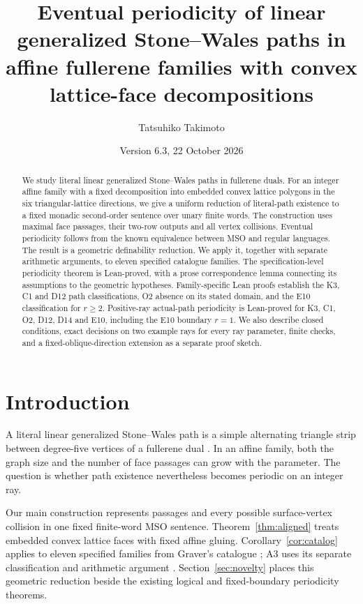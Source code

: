 \documentclass[11pt]{amsart}
\title[Affine fullerene families and eventual periodicity]{Eventual periodicity of linear generalized Stone--Wales paths in affine fullerene families with convex lattice-face decompositions}
\author{Tatsuhiko Takimoto}
\date{Version 6.3, 22 October 2026}
\theoremstyle{definition}\newtheorem{definition}{Definition}
\begin{document}
\begin{abstract}
We study literal linear generalized Stone--Wales paths in fullerene
duals. For an integer affine family with a fixed decomposition into
embedded convex lattice polygons in the six triangular-lattice
directions, we give a uniform reduction of literal-path existence to a
fixed monadic second-order sentence over unary finite words. The
construction uses maximal face passages, their two-row outputs and all
vertex collisions. Eventual periodicity follows from the known equivalence
between MSO and regular languages. The result is a geometric definability
reduction. We apply it, together with separate arithmetic arguments,
to eleven specified catalogue families. The specification-level
periodicity theorem is Lean-proved, with a prose correspondence lemma
connecting its assumptions to the geometric hypotheses. Family-specific
Lean proofs establish the K3, C1 and D12 path classifications, O2
absence on its stated domain, and the E10 classification for $r\ge2$.
Positive-ray actual-path periodicity is Lean-proved for K3, C1, O2,
D12, D14 and E10, including the E10 boundary $r=1$. We also describe closed conditions, exact decisions on
two example rays for every ray parameter, finite checks, and a
fixed-oblique-direction extension as a separate proof sketch.
\end{abstract}
\maketitle

\section{Introduction}
A literal linear generalized Stone--Wales path is a simple alternating
triangle strip between degree-five vertices of a fullerene dual
\cite{BBS}. In an affine family, both the graph size and the number of
face passages can grow with the parameter. The question is whether
path existence nevertheless becomes periodic on an integer ray.

Our main construction represents passages and every possible
surface-vertex collision in one fixed finite-word MSO sentence.
Theorem~\ref{thm:aligned} treats embedded convex lattice faces with
fixed affine gluing. Corollary~\ref{cor:catalog} applies to eleven
specified families from Graver's catalogue \cite{Graver}; A3 uses its
separate classification and arithmetic argument \cite{A3}.
Section~\ref{sec:novelty} places this geometric reduction beside the
existing logical and fixed-boundary periodicity theorems.
\end{document}
